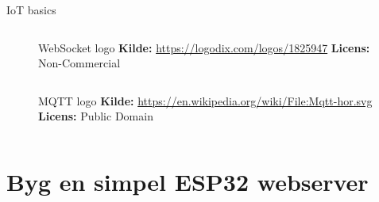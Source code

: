 \documentclass[aspectratio=169]{beamer}
\begin{document}
\begin{frame}{IoT basics}
\begin{columns}
\begin{column}{0.4\textwidth}
\begin{columns}
\begin{column}{0.45\textwidth}
				\begin{figure}[height=0.2\textheight]
  					
  					\caption{WebSocket logo
  					\captionline \textbf{Kilde:} \url{https://logodix.com/logos/1825947}
  					\captionline \textbf{Licens:} Non-Commercial}
  					\label{fig:websocket-logo}
				\end{figure}
			\end{column}
		\end{columns}
		\begin{columns}
			\begin{column}{0.45\textwidth}
				\begin{figure}[height=0.2\textheight]
  					
  					\caption{MQTT logo
  					\captionline \textbf{Kilde:} \url{https://en.wikipedia.org/wiki/File:Mqtt-hor.svg}
  					\captionline \textbf{Licens:} Public Domain}
  					\label{fig:mqtt-logo}
				\end{figure}
			\end{column}
		\end{columns}
	\end{column}
\end{columns}
\end{frame}

\section{Byg en simpel ESP32 webserver}
\begin{frame}
\end{frame}
\end{document}

